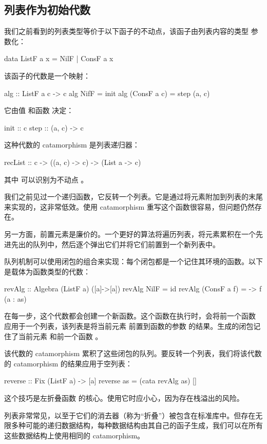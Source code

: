 \documentclass[DaoFP]{subfiles}
\begin{document}
\subsection{列表作为初始代数}

我们之前看到的列表类型等价于以下函子的不动点，该函子由列表内容的类型  参数化：
\begin{haskell}
data ListF a x = NilF | ConsF a x
\end{haskell}
该函子的代数是一个映射：
\begin{haskell}
alg :: ListF a c -> c
alg NifF = init
alg (ConsF a c) = step (a, c)
\end{haskell}
它由值  和函数  决定：
\begin{haskell}
init :: c
step :: (a, c) -> c
\end{haskell}
这种代数的 catamorphism 是列表递归器：
\begin{haskell}
recList :: c -> ((a, c) -> c) -> (List a -> c)
\end{haskell}
其中  可以识别为不动点 。

我们之前见过一个递归函数，它反转一个列表。它是通过将元素附加到列表的末尾来实现的，这非常低效。使用 catamorphism 重写这个函数很容易，但问题仍然存在。

另一方面，前置元素是廉价的。一个更好的算法将遍历列表，将元素累积在一个先进先出的队列中，然后逐个弹出它们并将它们前置到一个新列表中。

队列机制可以使用闭包的组合来实现：每个闭包都是一个记住其环境的函数。以下是载体为函数类型的代数：
\begin{haskell}
revAlg :: Algebra (ListF a) ([a]->[a])
revAlg NilF = id
revAlg (ConsF a f) = \as -> f (a : as)
\end{haskell}
在每一步，这个代数都会创建一个新函数。这个函数在执行时，会将前一个函数  应用于一个列表，该列表是将当前元素  前置到函数的参数  的结果。生成的闭包记住了当前元素  和前一个函数 。

该代数的 catamorphism 累积了这些闭包的队列。要反转一个列表，我们将该代数的 catamorphism 的结果应用于空列表：
\begin{haskell}
reverse :: Fix (ListF a) -> [a]
reverse as = (cata revAlg as) []
\end{haskell}
这个技巧是左折叠函数  的核心。使用它时应小心，因为存在栈溢出的风险。

列表非常常见，以至于它们的消去器（称为“折叠”）被包含在标准库中。但存在无限多种可能的递归数据结构，每种数据结构由其自己的函子生成，我们可以在所有这些数据结构上使用相同的 catamorphism。
\end{document}
